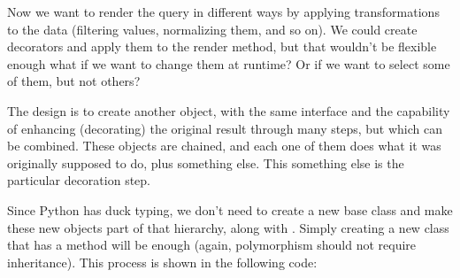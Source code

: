 \documentclass[a4paper,10pt,english]{sphinxmanual}
\begin{document}
Now we want to render the query in different ways by applying transformations to the
data (filtering values, normalizing them, and so on). We could create decorators and apply
them to the render method, but that wouldn’t be flexible enough what if we want to
change them at runtime? Or if we want to select some of them, but not others?

The design is to create another object, with the same interface and the capability of
enhancing (decorating) the original result through many steps, but which can be combined.
These objects are chained, and each one of them does what it was originally supposed to
do, plus something else. This something else is the particular decoration step.

Since Python has duck typing, we don’t need to create a new base class and make these new
objects part of that hierarchy, along with . Simply creating a new class that has
a  method will be enough (again, polymorphism should not require inheritance).
This process is shown in the following code:

\begin{sphinxVerbatim}[commandchars=\\\{\}]
 
       
          

     
         

 
     
          
                 

 
     
          
               
\end{sphinxVerbatim}
\end{document}
